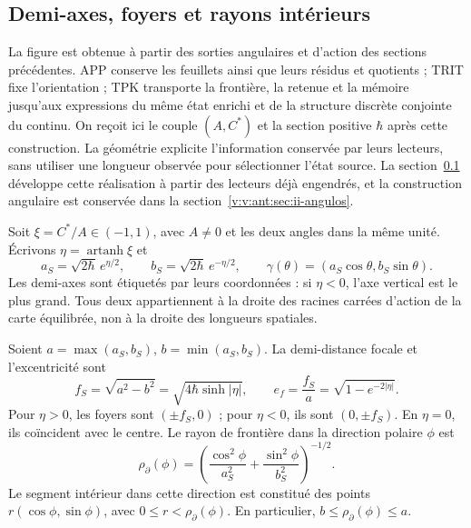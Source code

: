 
\subsection{Demi-axes, foyers et rayons intérieurs}
\label{ii:sec:ii-elipse-geometria}

La figure est obtenue à partir des sorties angulaires et d’action des sections précédentes. APP conserve les feuillets ainsi que leurs résidus et quotients ; TRIT fixe l’orientation ; TPK transporte la frontière, la retenue et la mémoire jusqu’aux expressions du même état enrichi et de la structure discrète conjointe du continu. On reçoit ici le couple \((A,C^*)\) et la section positive \(\hbar\) après cette construction. La géométrie explicite l’information conservée par leurs lecteurs, sans utiliser une longueur observée pour sélectionner l’état source. La section~\ref{ii:sec:ii-elipse-geometria} développe cette réalisation à partir des lecteurs déjà engendrés, et la construction angulaire est conservée dans la section~\ref{v:v:ant:sec:ii-angulos}.

Soit \(\xi=C^*/A\in(-1,1)\), avec \(A\ne0\) et les deux angles dans la
même unité. Écrivons \(\eta=\operatorname{artanh}\xi\) et
\[
 a_S=\sqrt{2\hbar}\,e^{\eta/2},\qquad
 b_S=\sqrt{2\hbar}\,e^{-\eta/2},\qquad
 \gamma(\theta)=(a_S\cos\theta,b_S\sin\theta).
\]
Les demi-axes sont étiquetés par leurs coordonnées : si \(\eta<0\),
l'axe vertical est le plus grand. Tous deux appartiennent à la droite des racines carrées
d'action de la carte équilibrée, non à la droite des longueurs spatiales.

\begin{proposition}
\label{ii:prop:ii-elipse-focos}
Soient \(a=\max(a_S,b_S)\), \(b=\min(a_S,b_S)\). La demi-distance
focale et l'excentricité sont
\begin{equation}
 f_S=\sqrt{a^2-b^2}
 =\sqrt{4\hbar\sinh|\eta|},\qquad
 e_f=\frac{f_S}{a}=\sqrt{1-e^{-2|\eta|}}.
 \label{ii:eq:ii-elipse-focal}
\end{equation}
Pour \(\eta>0\), les foyers sont \((\pm f_S,0)\) ; pour
\(\eta<0\), ils sont \((0,\pm f_S)\). En \(\eta=0\), ils coïncident avec
le centre. Le rayon de frontière dans la direction polaire \(\phi\) est
\begin{equation}
 \rho_{\partial}(\phi)
 =\left(\frac{\cos^2\phi}{a_S^2}
        +\frac{\sin^2\phi}{b_S^2}\right)^{-1/2}.
 \label{ii:eq:ii-elipse-radio-polar}
\end{equation}
Le segment intérieur dans cette direction est constitué des points
\(r(\cos\phi,\sin\phi)\), avec \(0\le r<\rho_{\partial}(\phi)\).
En particulier, \(b\le\rho_{\partial}(\phi)\le a\).
\end{proposition}


